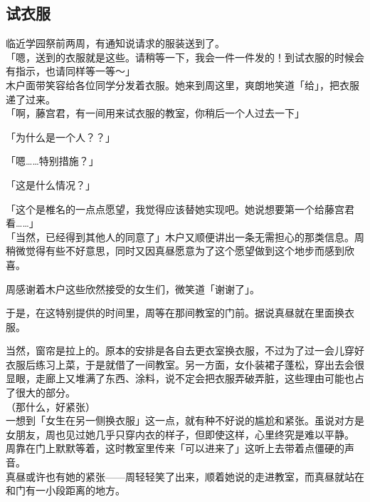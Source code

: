 \subsection{试衣服}

临近学园祭前两周，有通知说请求的服装送到了。\\

「嗯，送到的衣服就是这些。请稍等一下，我会一件一件发的！到试衣服的时候会有指示，也请同样等一等～」\\

木户面带笑容给各位同学分发着衣服。她来到周这里，爽朗地笑道「给」，把衣服递了过来。\\

「啊，藤宫君，有一间用来试衣服的教室，你稍后一个人过去一下」

「为什么是一个人？？」

「嗯……特别措施？」

「这是什么情况？」

「这个是椎名的一点点愿望，我觉得应该替她实现吧。她说想要第一个给藤宫君看……」\\

「当然，已经得到其他人的同意了」木户又顺便讲出一条无需担心的那类信息。周稍微觉得有些不好意思，同时又因真昼愿意为了这个愿望做到这个地步而感到欣喜。

周感谢着木户这些欣然接受的女生们，微笑道「谢谢了」。\\

\vspace{2\baselineskip}

于是，在这特别提供的时间里，周等在那间教室的门前。据说真昼就在里面换衣服。

当然，窗帘是拉上的。原本的安排是各自去更衣室换衣服，不过为了过一会儿穿好衣服后练习上菜，于是就借了一间教室。另一方面，女仆装裙子蓬松，穿出去会很显眼，走廊上又堆满了东西、涂料，说不定会把衣服弄破弄脏，这些理由可能也占了很大的部分。\\

（那什么，好紧张）\\

一想到「女生在另一侧换衣服」这一点，就有种不好说的尴尬和紧张。虽说对方是女朋友，周也见过她几乎只穿内衣的样子，但即使这样，心里终究是难以平静。\\

周靠在门上默默等着，这时教室里传来「可以进来了」这听上去带着点僵硬的声音。\\

真昼或许也有她的紧张——周轻轻笑了出来，顺着她说的走进教室，而真昼就站在和门有一小段距离的地方。\\


